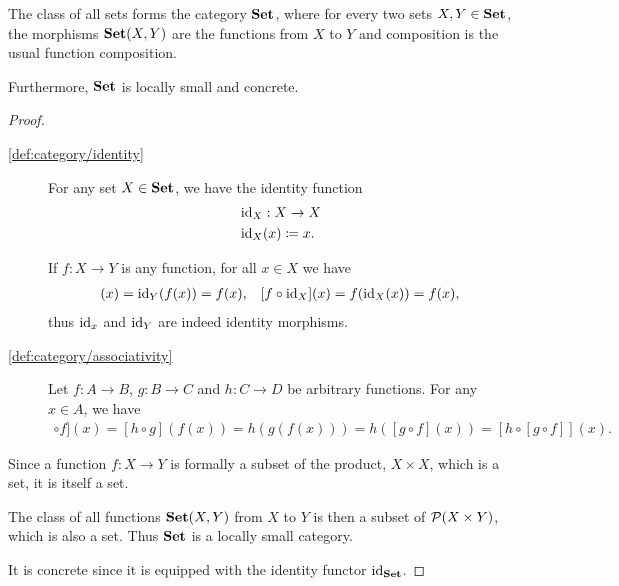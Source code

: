 \begin{definition}\label{def:category_of_sets}
  The class of all sets forms the category $\operatorname{\mathbf{Set}}$, where for every two sets $X, Y \in \operatorname{\mathbf{Set}}$, the morphisms $\operatorname{\mathbf{Set}}(X, Y)$ are the functions from $X$ to $Y$ and composition is the usual function composition.

  Furthermore, $\operatorname{\mathbf{Set}}$ is locally small and concrete.
\end{definition}
\begin{proof}
  \begin{description}
    \item [\ref{def:category/identity}] For any set $X \in \operatorname{\mathbf{Set}}$, we have the identity function
    \begin{align*}
      &\operatorname{id}_X: X \to X \\
      &\operatorname{id}_X(x) \coloneqq x.
    \end{align*}

    If $f: X \to Y$ is any function, for all $x \in X$ we have
    \begin{align*}
      [\Id_Y \circ f](x) = \Id_Y(f(x)) = f(x),
      &&
      [f \circ \Id_X](x) = f(\Id_X(x)) = f(x),
    \end{align*}
    thus $\operatorname{id}_x$ and $\operatorname{id}_Y$ are indeed identity morphisms.

    \item [\ref{def:category/associativity}] Let $f: A \to B$, $g: B \to C$ and $h: C \to D$ be arbitrary functions. For any $x \in A$, we have
    \begin{align*}
      [[h \circ g] \circ f](x)
      =
      [h \circ g](f(x))
      =
      h(g(f(x)))
      =
      h([g \circ f](x))
      =
      [h \circ [g \circ f]](x).
    \end{align*}
  \end{description}

  Since a function $f: X \to Y$ is formally a subset of the product, $X \times X$, which is a set, it is itself a set.

  The class of all functions $\operatorname{\mathbf{Set}}(X, Y)$ from $X$ to $Y$ is then a subset of $\operatorname{\mathcal P}(X \times Y)$, which is also a set. Thus $\operatorname{\mathbf{Set}}$ is a locally small category.

  It is concrete since it is equipped with the identity functor $\operatorname{id}_{\operatorname{\mathbf{Set}}}$.
\end{proof}

